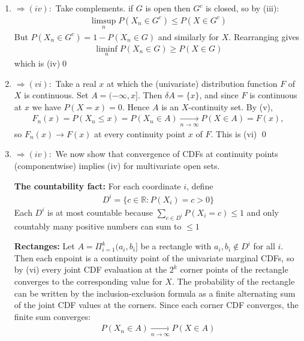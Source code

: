 \documentclass[10pt]{article}
\begin{document}
\begin{enumerate}[label=\textit{(\roman*)}]
    \item $\Longrightarrow (iv):$ Take complements. if $G$ is open then $G^c$ is closed, so by (iii):
    \begin{gather*}
        \limsup_nP(X_n\in G^c)\leq P(X\in G^c)
    \end{gather*}
    But $P(X_n \in G^c) = 1 - P(X_n \in G)$ and similarly for $X$. Rearranging gives 
    \begin{gather*}
        \liminf_nP(X_n \in G) \geq P(X \in G)
    \end{gather*}
    which is (iv)\qed
    \setcounter{enumi}{4}
    \item $\Longrightarrow (vi):$ Take a real $x$ at which the (univariate) distribution function $F$ of $X$ is continuous. Set $A = (-\infty, x]$. Then $\delta A = \{x\}$, and since $F$ is continuous at $x$ we have $P(X = x) = 0$. Hence $A$ is an $X$-continuity set. By (v),
    \begin{gather*}
        F_n(x) = P(X_n \leq x) = P(X_n \in A) \xrightarrow[n \to \infty]{}P(X \in A) = F(x),
    \end{gather*}
    so $F_n(x) \to F(x)$ at every continuity point $x$ of $F$. This is (vi) \qed
    \item $\Longrightarrow (iv):$ We now show that convergence of CDFs at continuity points (componentwise) implies (iv) for multivariate open sets.
    
    \textbf{The countability fact:} For each coordinate $i$, define 
    \begin{gather*}
        D^i = \{c \in \mathbb{R}: P(X_i) = c>0\}
    \end{gather*}
    Each $D^i$ is at most countable because $\sum_{c \in D^i}P(X_i = c) \leq 1$ and only countably many positive numbers can sum to $\leq1$

    \textbf{Rectanges:} Let $A = \Pi_{i = 1}^k (a_i, b_i]$ be a rectangle with $a_i, b_i \notin D^i$ for all $i$. Then each enpoint is a continuity point of the univariate marginal CDFs, so by (vi) every joint CDF evaluation at the $2^k$ corner points of the rectangle converges to the corresponding value for $X$. The probability of the rectangle can be written by the inclusion-exclusion formula as a finite alternating sum of the joint CDF values at the corners. Since each corner CDF converges, the finite sum converges: 
    \begin{gather*}
        P(X_n \in A) \xrightarrow[n \to \infty]{}P(X \in A) 
    \end{gather*}


\end{enumerate}
\end{document}
